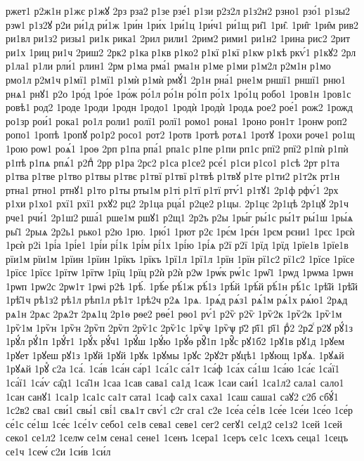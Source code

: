 {ржет1
р2ж1н
р1жє
р1жꙋ
2рз
рза2
р1зе
рзе́1
р1зи
р2з2л
р1з2н2
рзно1
рзо́1
р1зы2
рзѡ1
р1з2ꙋ
р2и
ри́1д
ри́1ж
1ри́н
1ри́х
1ри́1ц
1ри́ч1
ри́1щ
ри̑1
1ри̑.
1ри̑г
1ри̑м
рив2
ри1вл
ри1з2
ризы1
ри1к
рика1
2рил
рили1
2рим2
рими1
ри1н2
1рина
рис2
2рит
ри1х
1риц
ри1ч
2риш2
2рк2
р1ка
р1кв
р1ко2
р1кї
р1кї
р1кѡ
р1кѣ
ркѵ́1
р1кꙋ2
2рл
р1ла1
р1ли
рли́1
рлин1
2рм
р1ма
рма́1
рма1н
р1ме
р1ми
р1м2л
р2м1н
р1мо
рмо1л
р2м1ч
р1мї1
р1мї1
р1мѝ
р1мѝ
рмꙋ́1
2р1н
рна́1
рне1м
рншї1
рншї1
рню1
рнѧ1
рнꙋ1
р2о
1ро́д
1ро́е
1ро́ж
ро́1л
ро́1н
ро́1п
ро́1х
1ро́1ц
робо1
1ров1н
1ров1с
ровѣ1
род2
1роде
1роди
1родн
1родо1
1родѝ
1родѝ
1родѧ
рое2
рое́1
рож2
1рожд
ро1зр
рои́1
рока1
ро1л
роли1
ролї1
ролї1
ромо1
рона1
1роно
рон1т
1ронѡ
роп2
ропо1
1ропѣ
1ропꙋ
ро1р2
росо1
рот2
1ротв
1ротѣ
ротѧ1
1ротꙋ
1рохи
роче1
ро1щ
1рою
роѡ1
роѧ́1
1роѳ
2рп
р1па
рпа́1
рпа1с
р1пе
р1пи
рп1с
рпї2
рпї2
р1пѝ
р1пѝ
р1пѣ
р1пѧ
рпѧ́1
р2пⷣ
2рр
р1ра
2рс2
р1са
р1се2
рсе́1
р1си
р1со1
р1сѣ
2рт
р1та
р1тва
р1тве
р1тво
р1твы
р1твє
р1твї
р1твї
р1твѣ
р1твꙋ
р1те
р1ти2
р1т2к
рт1н
ртна1
ртно1
ртнꙋ1
р1то
р1ты
рты1м
р1ті
р1тї
р1тї
ртѵ́1
р1тꙋ1
2р1ф
рфѵ́1
2рх
р1хи
р1хо1
рхї1
рхї1
рхꙋ2
рц2
2р1ца
рца́1
р2це2
р1цы.
2р1цє
2р1цѣ
2р1цꙋ
2р1ч
рче1
рчи́1
2р1ш2
рша́1
рше1м
ршꙋ1
р2щ1
2р2ъ
р2ы
1ры́г
ры́1с
ры́1т
ры́1ш
1ры́ѧ
ры̑1
2рыѧ
2р2ь1
рько1
р2ю
1рю.
1рю́1
1рют
р2є
1рє́м
1рє́н
1рєм
рєни1
1рєс
1рєѝ
1рєѝ
р2і
1рі́а
1рі́е1
1рі́и
рі́1к
1рі́м
рі́1х
1рі́ю
1рі́ѧ
р2ї
р2ї
1рїд
1рїд
1рїе1в
1рїе1в
рїи1м
рїи1м
1рїин
1рїин
1рїкъ
1рїкъ
1рї1л
1рї1л
1рїн
1рїн
рї1с2
рї1с2
1рїсе
1рїсе
1рїсє
1рїсє
1рїтѡ
1рїтѡ
1рїц
1рїц
р2ѝ
р2ѝ
р2ѡ
1рѡ́к
рѡ́1с
1рѡ̑1
1рѡд
1рѡма
1рѡн
1рѡп
1рѡ2с
2рѡ1т
1рѡі
р2ѣ
1рѣ́.
1рѣ́е
рѣ́1ж
рѣ́1з
1рѣ́й
1рѣ́й
рѣ́1н
рѣ́1с
1рѣ̑й
1рѣ̑й
1рѣ̑1ч
рѣ1з2
рѣ1л
рѣп1л
рѣ1т
1рѣ2ч
р2ѧ
1рѧ.
1рѧ́д
рѧ́з1
рѧ́1м
рѧ́1х
рѧ́ю1
2рѧд
рѧ1н
2рѧс
2рѧ2т
2рѧ1ц
2р1ѳ
рѳе2
рѳе́1
рѳо1
рѵ́1
р2ѷ
р2ѷ
1рѷ2к
1рѷ2к
1рѷ1м
1рѷ1м
1рѷн
1рѷн
2рѷп
2рѷп
2рѷ1с
2рѷ1с
1рѷѱ
1рѷѱ
р҃2
р҃ї1
р҃ї1
рⷣ2
2р2ⷭ
р2ꙋ
рꙋ́1з
1рꙋ́л
рꙋ́1п
1рꙋ́т1
1рꙋ́х
рꙋ́ч1
1рꙋ́ш
1рꙋ́ю
1рꙋ́ѳ
рꙋ̑1п
1рꙋ̑с
рꙋ1б2
1рꙋ1в
рꙋ1д
1рꙋем
1рꙋет
1рꙋеш
рꙋ1з
1рꙋй
1рꙋй
1рꙋк
1рꙋмы
1рꙋс
2рꙋ2т
рꙋцѣ1
1рꙋющ
1рꙋѧ.
1рꙋѧй
1рꙋѧй
1рꙋⷯ
с2а
1са́.
1са́в
1са́н
са́р1
1са́1с
са́1т
1са́ф
1са́х
са́1ш
1са́ю
1са́є
1са́ї1
1са́ї1
1са́ѵ
са̑д1
1са̑1н
1саа
1сав
сава1
са1д
1саж
1саи
саи́1
1са1л2
сала1
сало1
1сан
санꙋ1
1са1р
1са1с
са1т
сата1
1саф
са1х
саха1
1саш
саша1
саꙋ2
с2б
сбꙋ́1
1с2в2
сва1
сви́1
свы́1
сві́1
свѧ1т
свѵ́1
с2г
сга1
с2е
1се́а
се́1в
1се́е
1се́и
1се́о
1се́р
се́1с
се́1ш
1се́є
1се́1ѵ
себо1
се1в
сева1
севе1
сег2
сегꙋ1
се1д2
се1з2
1сей
1сей
секо1
се1л2
1селѡ
се1м
сена1
сене1
1сенъ
1сера1
1серъ
се1с
1сехъ
сеца1
1сецъ
се1ч
1сеѡ́
с2и
1си́в
1си́л
}
